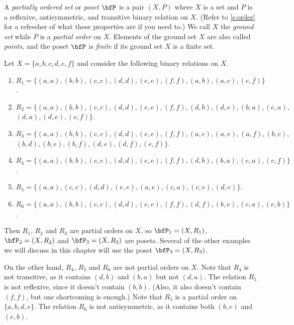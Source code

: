 A \textit{partially ordered set} or \textit{poset} $\bfP$ is a pair
$(X,P)$ where $X$ is a set and $P$ is a reflexive, antisymmetric, and
transitive binary relation on $X$. (Refer to \autoref{s:order} for a
refresher of what these properties are if you need to.) We call $X$
the \textit{ground set} while $P$ is a \textit{partial order} on
$X$. Elements of the ground set $X$ are also called \textit{points},
and the poset $\bfP$ is \textit{finite} if its ground set $X$ is a
finite set.

\begin{example}\label{exa:binaryrel}
Let $X=\{a,b,c,d,e,f\}$ and consider the following binary relations
on $X$.
\begin{enumerate}
\item $R_1=\{(a,a),(b,b),(c,c),(d,d),(e,e),(f,f),(a,b),(a,c),(e,f)\}$.
\item $R_2=\{(a,a),(b,b),(c,c),(d,d),(e,e),(f,f),(d,b),(d,e),(b,a),(e,a),$\\
 $(d,a),(d,e),(c,f)\}$.
\item $R_3=\{(a,a),(b,b),(c,c),(d,d),(e,e),(f,f),(a,c),(a,e),(a,f),(b,c),$\\
 $(b,d),(b,e),(b,f),(d,e),(d,f),(e,f)\}$.
\item $R_4=\{(a,a),(b,b),(c,c),(d,d),(e,e),(f,f),(d,b),(b,a),(e,a),(c,f)\}$.
\item $R_5=\{(a,a),(c,c),(d,d),(e,e),(a,e),(c,a),(c,e),(d,e)\}$.
\item $R_6=\{(a,a),(b,b),(c,c),(d,d),(e,e),(f,f),(d,f),(b,e),(c,a),(e,b)\}$.
\end{enumerate}
Then $R_1$, $R_2$ and $R_3$ are partial orders on $X$, so $\bfP_1=(X,R_1)$,
$\bfP_2=(X,R_2)$ and $\bfP_3=(X,R_3)$ are posets.  Several of the other examples
we will discuss in this chapter will use the poset $\bfP_3=(X,R_3)$.  

On the other hand, $R_4$, $R_5$ and $R_6$ are not partial orders on
$X$.  Note that $R_4$ is not transitive, as it contains $(d,b)$ and
$(b,a)$ but not $(d,a)$.  The relation $R_5$ is not reflexive, since
it doesn't contain $(b,b)$.  (Also, it also doesn't contain $(f,f)$,
but one shortcoming is enough.) Note that $R_5$ is a partial order on
$\{a,b,d,e\}$.  The relation $R_6$ is not antisymmetric, as it
contains both $(b,e)$ and $(e,b)$.
\end{example}

